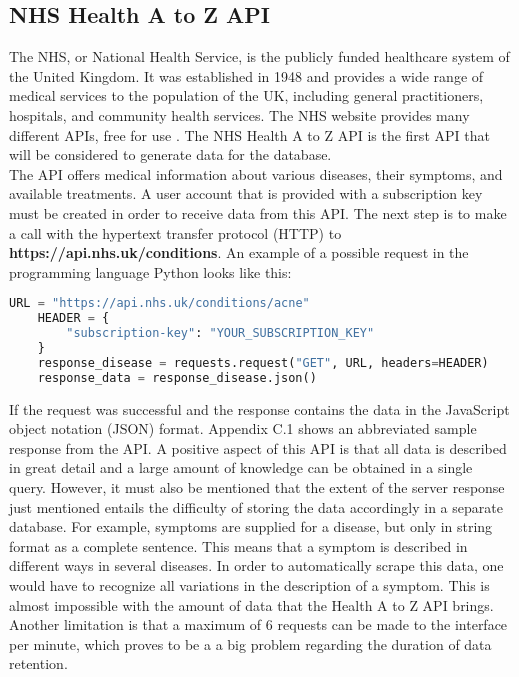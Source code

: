 \subsection{NHS Health A to Z API}
The NHS, or National Health Service, is the publicly funded healthcare system of the United Kingdom. It was established in 1948 and provides a wide range of medical services to the population of the UK, including general practitioners, hospitals, and community health services. The NHS website provides many different APIs, free for use \cite{.nhs}. The NHS Health A to Z API is the first API that will be considered to generate data for the database.
\newline \\
The API offers medical information about various diseases, their symptoms, and available treatments. A user account that is provided with a subscription key must be created in order to receive data from this API. The next step is to make a call with the hypertext transfer protocol (HTTP) to \textbf{https://api.nhs.uk/conditions}. An example of a possible request in the programming language Python looks like this:
\begin{lstlisting}[language=Python, caption={Example Python Request for the Health A to Z API}]
	URL = "https://api.nhs.uk/conditions/acne"
	HEADER = {
		"subscription-key": "YOUR_SUBSCRIPTION_KEY"
	}
	response_disease = requests.request("GET", URL, headers=HEADER)
	response_data = response_disease.json()
\end{lstlisting}
If the request was successful and the response contains the data in the JavaScript object notation (JSON) format. Appendix C.1 shows an abbreviated sample response from the API. A positive aspect of this API is that all data is described in great detail and a large amount of knowledge can be obtained in a single query. However, it must also be mentioned that the extent of the server response just mentioned entails the difficulty of storing the data accordingly in a separate database. For example, symptoms are supplied for a disease, but only in string format as a complete sentence. This means that a symptom is described in different ways in several diseases. In order to automatically scrape this data, one would have to recognize all variations in the description of a symptom. This is almost impossible with the amount of data that the Health A to Z API brings. Another limitation is that a maximum of 6 requests can be made to the interface per minute, which proves to be a a big problem regarding the duration of data retention.


